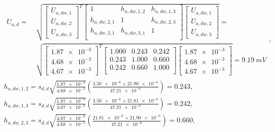 \begin{gather}
\begin{split}
U_{a,d} = ~ & \sqrt{
\begin{bmatrix}
U_{a,dw,1} \\ U_{a,dw,2} \\ U_{a,dw,3}
\end{bmatrix}^{T}
\begin{bmatrix}
1            & h_{a,dw,1,2} & h_{a,dw,1,3} \\
h_{a,dw,2,1} & 1            & h_{a,dw,2,3} \\
h_{a,dw,3,1} & h_{a,dw,3,1} & 1                 \\
\end{bmatrix}
\begin{bmatrix}
U_{a,dw,1} \\ U_{a,dw,2} \\ U_{a,dw,3}
\end{bmatrix}} = ~ \\ & \sqrt{
\begin{bmatrix}
\num{1.87e-3} \\ \num{4.68e-3} \\ \num{4.67e-3}
\end{bmatrix}^{T}
\begin{bmatrix}
\num{1.000} & \num{0.243} & \num{0.242} \\
\num{0.243} & \num{1.000} & \num{0.660} \\
\num{0.242} & \num{0.660} & \num{1.000} \\
\end{bmatrix}
\begin{bmatrix}
\num{1.87e-3} \\ \num{4.68e-3} \\ \num{4.67e-3}
\end{bmatrix}} = \qty{9.19}{mV}
\end{split}
\label{eq:sym_parta_uncert_dyn}, \\
h_{a,dw,1,2} = s_{d,d} \sqrt{\frac{\num{1.87e-3}}{\num{4.68e-3}}} \left( \frac{\num{3.50e-6} + \num{21.90e-6}}{\num{47.21e-6}} \right) = \num{0.243} \label{eq:sym_parta_coher_dw_1_2}, \\
h_{a,dw,1,3} = s_{d,d} \sqrt{\frac{\num{1.87e-3}}{\num{4.67e-3}}} \left( \frac{\num{3.50e-6} + \num{21.81e-6}}{\num{47.21e-6}} \right) = \num{0.242} \label{eq:sym_parta_coher_dw_1_3}, \\
h_{a,dw,2,3} = s_{d,d} \sqrt{\frac{\num{4.67e-3}}{\num{4.68e-3}}} \left( \frac{\num{21.81e-6} + \num{21.90e-6}}{\num{47.21e-6}} \right) = \num{0.660} \label{eq:sym_parta_coher_dw_2_3}, \\

\end{gather}
